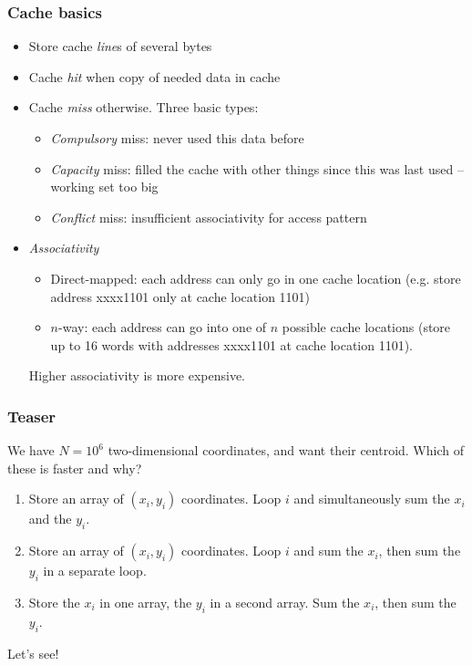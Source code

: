 \documentclass{beamer}
\begin{document}
\begin{frame}
  \frametitle{Cache basics}

  \begin{itemize}
  \item Store cache {\em line}s of several bytes
  \item Cache {\em hit} when copy of needed data in cache
  \item Cache {\em miss} otherwise.  Three basic types:
    \begin{itemize}
    \item {\em Compulsory} miss: never used this data before
    \item {\em Capacity} miss: filled the cache with other things
      since this was last used -- working set too big
    \item {\em Conflict} miss: insufficient associativity for access
      pattern
    \end{itemize}
    \item {\em Associativity}
      \begin{itemize}
      \item Direct-mapped: each address can only go in one cache location
        (e.g. store address xxxx1101 only at cache location 1101)
      \item $n$-way: each address can go into one of $n$ possible cache
        locations (store up to 16 words with addresses xxxx1101 at cache
        location 1101).
      \end{itemize}
      Higher associativity is more expensive.
  \end{itemize}

\end{frame}


\begin{frame}
  \frametitle{Teaser}

  We have $N = 10^6$ two-dimensional coordinates, and want their centroid.
  Which of these is faster and why?
  \begin{enumerate}
  \item
    Store an array of $(x_i, y_i)$ coordinates.  Loop $i$ and simultaneously
    sum the $x_i$ and the $y_i$.
  \item
    Store an array of $(x_i, y_i)$ coordinates.  Loop $i$ and sum the $x_i$,
    then sum the $y_i$ in a separate loop.
  \item
    Store the $x_i$ in one array, the $y_i$ in a second array.  Sum the
    $x_i$, then sum the $y_i$.
  \end{enumerate}
  Let's see!

\end{frame}
\end{document}
